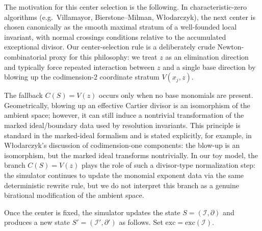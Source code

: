 \documentclass[11pt]{amsart}
\begin{document}
The motivation for this center selection is the following. 
In characteristic-zero algorithms (e.g.\ Villamayor, Bierstone--Milman, W{\l}odarczyk), the next center is chosen canonically
as the smooth maximal stratum of a well-founded local invariant, with normal crossings conditions relative to the accumulated exceptional divisor.
Our center-selection rule is a deliberately crude Newton-combinatorial proxy for this philosophy: we treat $z$ as an elimination direction and 
typically force repeated interaction between $z$ and a single base direction by blowing up the codimension-$2$ coordinate stratum $V(x_j,z)$.

The fallback $C(S)=V(z)$ occurs only when no base monomials are present. 
Geometrically, blowing up an effective Cartier divisor is an isomorphism of the ambient space; however, it can still induce a nontrivial
transformation of the marked ideal/boundary data used by resolution invariants. 
This principle is standard in the marked-ideal formalism and is stated explicitly, for example, in W{\l}odarczyk's discussion of codimension-one
components: the blow-up is an isomorphism, but the marked ideal transforms nontrivially. 
In our toy model, the branch $C(S)=V(z)$ plays the role of such a divisor-type normalization step: the simulator continues to update the monomial
exponent data via the same deterministic rewrite rule, but we do not interpret this branch as a genuine birational modification of the ambient space.

Once the center is fixed, the simulator updates the state $S=(\mathcal I,\partial)$ and produces a new state
$S'=(\mathcal I',\partial')$ as follows. Set $\mathrm{exc}=\mathrm{exc}(\mathcal I)$.
\end{document}
